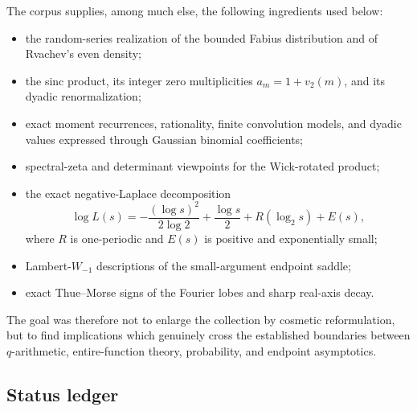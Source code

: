 \documentclass[11pt,oneside]{article}
\theoremstyle{definition}
\theoremstyle{remark}
\begin{document}
The corpus supplies, among much else, the following ingredients used below:
\begin{itemize}
\item the random-series realization of the bounded Fabius distribution and of
      Rvachev's even density;
\item the sinc product, its integer zero multiplicities
      $a_m=1+v_2(m)$, and its dyadic renormalization;
\item exact moment recurrences, rationality, finite convolution models, and
      dyadic values expressed through Gaussian binomial coefficients;
\item spectral-zeta and determinant viewpoints for the Wick-rotated product;
\item the exact negative-Laplace decomposition
      \[
      \log L(s)=-\frac{(\log s)^2}{2\log2}+\frac{\log s}{2}
        +R(\log_2s)+E(s),
      \]
      where $R$ is one-periodic and $E(s)$ is positive and exponentially
      small;
\item Lambert-$W_{-1}$ descriptions of the small-argument endpoint saddle;
\item exact Thue--Morse signs of the Fourier lobes and sharp real-axis decay.
\end{itemize}
The goal was therefore not to enlarge the collection by cosmetic reformulation,
but to find implications which genuinely cross the established boundaries
between $q$-arithmetic, entire-function theory, probability, and endpoint
asymptotics.

\subsection{Status ledger}
\end{document}
